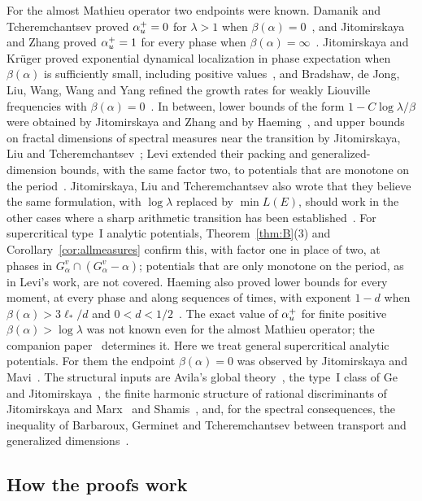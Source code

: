 For the almost Mathieu operator two endpoints were known. Damanik and Tcheremchantsev proved $\alpha_u^+=0$ for $\lambda>1$ when $\beta(\alpha)=0$~\cite{DT2007}, and Jitomirskaya and Zhang proved $\alpha_u^+=1$ for every phase when $\beta(\alpha)=\infty$~\cite{JZ2022}. Jitomirskaya and Kr\"uger proved exponential dynamical localization in phase expectation when $\beta(\alpha)$ is sufficiently small, including positive values~\cite{JK2013}, and Bradshaw, de Jong, Liu, Wang, Wang and Yang refined the growth rates for weakly Liouville frequencies with $\beta(\alpha)=0$~\cite{BdJLWWY2025}. In between, lower bounds of the form $1-C\log\lambda/\beta$ were obtained by Jitomirskaya and Zhang and by Haeming~\cite{JZ2022,Haeming2025}, and upper bounds on fractal dimensions of spectral measures near the transition by Jitomirskaya, Liu and Tcheremchantsev~\cite{JLT2025}; Levi extended their packing and generalized-dimension bounds, with the same factor two, to potentials that are monotone on the period~\cite[Theorems~1.1 and~1.3]{Levi2025}. Jitomirskaya, Liu and Tcheremchantsev also wrote that they believe the same formulation, with $\log\lambda$ replaced by $\min L(E)$, should work in the other cases where a sharp arithmetic transition has been established~\cite[Section~1]{JLT2025}. For supercritical type~I analytic potentials, Theorem~\ref{thm:B}(3) and Corollary~\ref{cor:allmeasures} confirm this, with factor one in place of two, at phases in $G^v_\alpha\cap(G^v_\alpha-\alpha)$; potentials that are only monotone on the period, as in Levi's work, are not covered. Haeming also proved lower bounds for every moment, at every phase and along sequences of times, with exponent $1-d$ when $\beta(\alpha)>3\ell_*/d$ and $0<d<1/2$~\cite[Theorem~1.1]{Haeming2025}. The exact value of $\alpha_u^+$ for finite positive $\beta(\alpha)>\log\lambda$ was not known even for the almost Mathieu operator; the companion paper~\cite{DMamo} determines it. Here we treat general supercritical analytic potentials. For them the endpoint $\beta(\alpha)=0$ was observed by Jitomirskaya and Mavi~\cite[Remark~1.12]{JitomirskayaMavi2017}. The structural inputs are Avila's global theory~\cite{Avila2015}, the type~I class of Ge and Jitomirskaya~\cite{GeJitomirskaya2024}, the finite harmonic structure of rational discriminants of Jitomirskaya and Marx~\cite{JitomirskayaMarx2012} and Shamis~\cite{Shamis2011}, and, for the spectral consequences, the inequality of Barbaroux, Germinet and Tcheremchantsev between transport and generalized dimensions~\cite{BGT2000}.

\subsection{How the proofs work}

